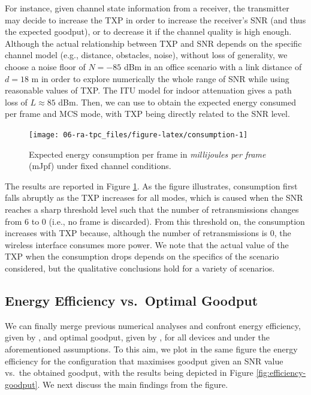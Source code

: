 \documentclass[twoside,nohyper]{tufte-book}
\makeatletter
\let\orig@maketag@@@\maketag@@@
\renewcommand{\eqref}[1]{\textup{\let\maketag@@@\orig@maketag@@@\tagform@{\ref{#1}}}}
\def\maketag@@@#1{\hbox{\rlap{\kern\marginparsep\m@th\normalfont#1}\kern1sp}}
\theoremstyle{definition}
\theoremstyle{definition}
\theoremstyle{definition}
\theoremstyle{remark}
\makeatother
\begin{document}
For instance, given channel state information from a receiver, the
transmitter may decide to increase the TXP in order to increase the
receiver's SNR (and thus the expected goodput), or to decrease it if the
channel quality is high enough. Although the actual relationship between
TXP and SNR depends on the specific channel model (e.g., distance,
obstacles, noise), without loss of generality, we choose a noise floor
of \(N=-85\) dBm in an office scenario with a link distance of \(d=18\)
m in order to explore numerically the whole range of SNR while using
reasonable values of TXP. The ITU model for indoor
attenuation\cite[-10mm]{iturp1238-2015}
gives a path loss of \(L\approx 85\) dBm. Then, we can use
\eqref{eq:energyperframe} to obtain the expected energy consumed per frame
and MCS mode, with TXP being directly related to the SNR level.




\begin{figure}

{\centering \texttt{[image: 06-ra-tpc\_files/figure-latex/consumption-1]} 

}

\caption[Expected energy consumption per frame in
\emph{millijoules per frame} (mJpf) under fixed channel conditions.]{Expected energy consumption per frame in
\emph{millijoules per frame} (mJpf) under fixed channel conditions.}\label{fig:consumption}
\end{figure}

The results are reported in Figure \ref{fig:consumption}. As the figure
illustrates, consumption first falls abruptly as the TXP increases for
all modes, which is caused when the SNR reaches a sharp threshold level
such that the number of retransmissions changes from 6 to 0 (i.e., no
frame is discarded). From this threshold on, the consumption increases
with TXP because, although the number of retransmissions is 0, the
wireless interface consumes more power. We note that the actual value of
the TXP when the consumption drops depends on the specifics of the
scenario considered, but the qualitative conclusions hold for a variety
of scenarios.

\subsection{Energy Efficiency vs.~Optimal
Goodput}\label{energy-efficiency-vs.optimal-goodput}

We can finally merge previous numerical analyses and confront energy
efficiency, given by \eqref{eq:efficiency}, and optimal goodput, given by
\eqref{eq:maxgoodput}, for all devices and under the aforementioned
assumptions. To this aim, we plot in the same figure the energy
efficiency for the configuration that maximises goodput given an SNR
value vs.~the obtained goodput, with the results being depicted in
Figure \ref{fig:efficiency-goodput}. We next discuss the main findings
from the figure.
\end{document}
